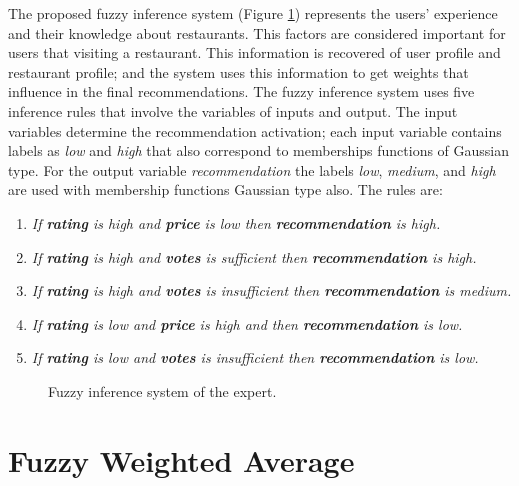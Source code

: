The proposed fuzzy inference system (Figure  \ref{fig:expertfis})
represents the users' experience and their knowledge about restaurants.
This factors are considered important for users that visiting a
restaurant. This information is recovered of user profile and
restaurant profile; and the system uses this information to get
weights that influence in the final recommendations. The fuzzy
inference system uses five inference rules that involve the variables of
inputs and output. The input variables determine the recommendation
activation; each input variable contains labels as \textit{low} and
\textit{high} that also correspond to memberships functions of
Gaussian type. For the output variable \textit{recommendation} the
labels \textit{low}, \textit{medium}, and \textit{high} are used with
membership functions Gaussian type also. The rules are:
\begin{enumerate} 
\item \textit{If \textbf{rating} is high and \textbf{price} is low then 
\textbf{recommendation} is high.}
\item \textit{If \textbf{rating} is high and \textbf{votes} is sufficient then 
\textbf{recommendation} is high.}
\item \textit{If \textbf{rating} is high and \textbf{votes} is insufficient then 
\textbf{recommendation} is medium.}
\item \textit{If \textbf{rating} is low and \textbf{price} is high and then 
\textbf{recommendation} is low.} 
\item \textit{If \textbf{rating} is low and \textbf{votes} is insufficient then 
\textbf{recommendation} is low.}
\end{enumerate} 
\begin{figure}
\captionsetup{justification=centering,margin=2cm,font=footnotesize}
\centering
{}
\caption{Fuzzy inference system of the expert.}
\label{fig:expertfis}      
\end{figure}

\section{Fuzzy Weighted Average} 

